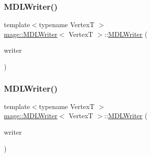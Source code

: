 \hypertarget{classmage_1_1_m_d_l_writer_ad244168d68c45fe7dcafa350c8a13fbe}{}\label{classmage_1_1_m_d_l_writer_ad244168d68c45fe7dcafa350c8a13fbe} 
\subsubsection{\texorpdfstring{M\+D\+L\+Writer()}{MDLWriter()}\hspace{0.1cm}{\footnotesize\ttfamily [2/3]}}
{\footnotesize\ttfamily template$<$typename VertexT $>$ \\
\hyperlink{classmage_1_1_m_d_l_writer}{mage\+::\+M\+D\+L\+Writer}$<$ VertexT $>$\+::\hyperlink{classmage_1_1_m_d_l_writer}{M\+D\+L\+Writer} (\begin{DoxyParamCaption}\item[{const \hyperlink{classmage_1_1_m_d_l_writer}{M\+D\+L\+Writer}$<$ VertexT $>$ \&}]{writer }\end{DoxyParamCaption})\hspace{0.3cm}{\ttfamily [delete]}}

\hypertarget{classmage_1_1_m_d_l_writer_acf2751035dfd4cca9884e6162830c5f5}{}\label{classmage_1_1_m_d_l_writer_acf2751035dfd4cca9884e6162830c5f5} 
\subsubsection{\texorpdfstring{M\+D\+L\+Writer()}{MDLWriter()}\hspace{0.1cm}{\footnotesize\ttfamily [3/3]}}
{\footnotesize\ttfamily template$<$typename VertexT $>$ \\
\hyperlink{classmage_1_1_m_d_l_writer}{mage\+::\+M\+D\+L\+Writer}$<$ VertexT $>$\+::\hyperlink{classmage_1_1_m_d_l_writer}{M\+D\+L\+Writer} (\begin{DoxyParamCaption}\item[{\hyperlink{classmage_1_1_m_d_l_writer}{M\+D\+L\+Writer}$<$ VertexT $>$ \&\&}]{writer }\end{DoxyParamCaption})\hspace{0.3cm}{\ttfamily [delete]}}

\hypertarget{classmage_1_1_m_d_l_writer_adcb78b5d8ac0d665f3bae0b643cd6932}{}\label{classmage_1_1_m_d_l_writer_adcb78b5d8ac0d665f3bae0b643cd6932} 
